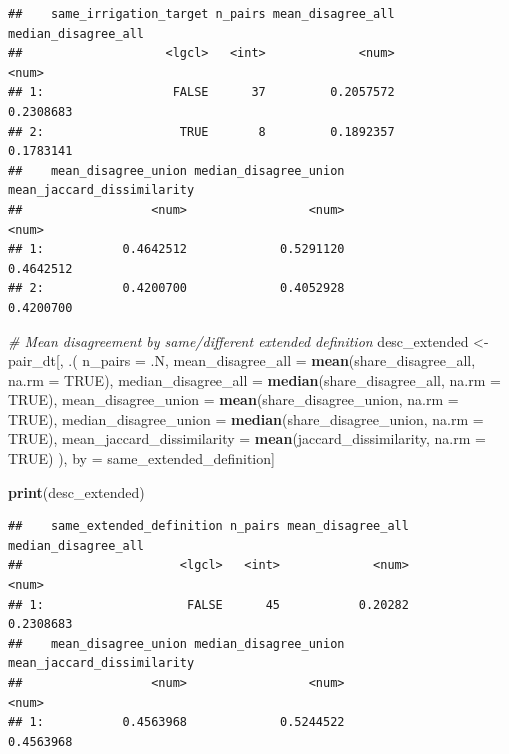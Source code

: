 \documentclass[
  11pt,
]{article}
\newenvironment{Shaded}{\begin{snugshade}}{\end{snugshade}}
\newcommand{\AttributeTok}[1]{\textcolor[rgb]{0.13,0.29,0.53}{#1}}
\newcommand{\CommentTok}[1]{\textcolor[rgb]{0.56,0.35,0.01}{\textit{#1}}}
\newcommand{\ConstantTok}[1]{\textcolor[rgb]{0.56,0.35,0.01}{#1}}
\newcommand{\FunctionTok}[1]{\textcolor[rgb]{0.13,0.29,0.53}{\textbf{#1}}}
\newcommand{\NormalTok}[1]{#1}
\newcommand{\OtherTok}[1]{\textcolor[rgb]{0.56,0.35,0.01}{#1}}
\begin{document}
\begin{verbatim}
##    same_irrigation_target n_pairs mean_disagree_all median_disagree_all
##                    <lgcl>   <int>             <num>               <num>
## 1:                  FALSE      37         0.2057572           0.2308683
## 2:                   TRUE       8         0.1892357           0.1783141
##    mean_disagree_union median_disagree_union mean_jaccard_dissimilarity
##                  <num>                 <num>                      <num>
## 1:           0.4642512             0.5291120                  0.4642512
## 2:           0.4200700             0.4052928                  0.4200700
\end{verbatim}

\begin{Shaded}
\begin{Highlighting}[]
\CommentTok{\# Mean disagreement by same/different extended definition}
\NormalTok{desc\_extended }\OtherTok{\textless{}{-}}\NormalTok{ pair\_dt[, .(}
  \AttributeTok{n\_pairs =}\NormalTok{ .N,}
  \AttributeTok{mean\_disagree\_all =} \FunctionTok{mean}\NormalTok{(share\_disagree\_all, }\AttributeTok{na.rm =} \ConstantTok{TRUE}\NormalTok{),}
  \AttributeTok{median\_disagree\_all =} \FunctionTok{median}\NormalTok{(share\_disagree\_all, }\AttributeTok{na.rm =} \ConstantTok{TRUE}\NormalTok{),}
  \AttributeTok{mean\_disagree\_union =} \FunctionTok{mean}\NormalTok{(share\_disagree\_union, }\AttributeTok{na.rm =} \ConstantTok{TRUE}\NormalTok{),}
  \AttributeTok{median\_disagree\_union =} \FunctionTok{median}\NormalTok{(share\_disagree\_union, }\AttributeTok{na.rm =} \ConstantTok{TRUE}\NormalTok{),}
  \AttributeTok{mean\_jaccard\_dissimilarity =} \FunctionTok{mean}\NormalTok{(jaccard\_dissimilarity, }\AttributeTok{na.rm =} \ConstantTok{TRUE}\NormalTok{)}
\NormalTok{), by }\OtherTok{=}\NormalTok{ same\_extended\_definition]}

\FunctionTok{print}\NormalTok{(desc\_extended)}
\end{Highlighting}
\end{Shaded}

\begin{verbatim}
##    same_extended_definition n_pairs mean_disagree_all median_disagree_all
##                      <lgcl>   <int>             <num>               <num>
## 1:                    FALSE      45           0.20282           0.2308683
##    mean_disagree_union median_disagree_union mean_jaccard_dissimilarity
##                  <num>                 <num>                      <num>
## 1:           0.4563968             0.5244522                  0.4563968
\end{verbatim}
\end{document}
